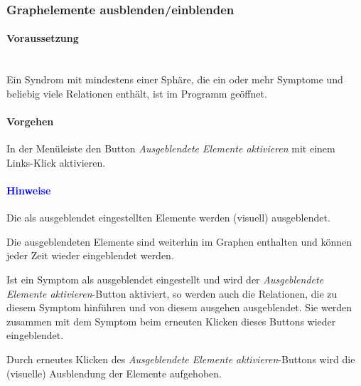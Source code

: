 \documentclass[enabledeprecatedfontcommands,fontsize=11pt,paper=a4,twoside]{scrartcl}
\newcounter{one}
\newcounter{two}[one]
\newcommand*{\hint}{\paragraph{\textcolor{blue}{Hinweise}}}
\newcommand*{\condition}{\paragraph{Voraussetzung}$\;$ \vspace{0.2cm}\\}
\newcommand*{\action}{\paragraph{Vorgehen}}
\let\tempone\itemize
\let\temptwo\enditemize
\renewenvironment{itemize}{\tempone\addtolength{\itemsep}{-10.0pt}}{\temptwo}
\let\origenumerate\enumerate
\let\origendenumerate\endenumerate
\renewenvironment{enumerate}{\origenumerate \addtolength{\itemsep}{-10.0pt}}{\origendenumerate}
\begin{document}
\subsubsection{Graphelemente ausblenden/einblenden}
		\condition 	
		Ein Syndrom mit mindestens einer Sphäre, die ein oder mehr Symptome und beliebig viele Relationen enthält, ist im Programm geöffnet.
		\action
			\begin{enumerate}
				\item In der Menüleiste den Button \textit{Ausgeblendete Elemente aktivieren} mit einem Links-Klick aktivieren.
			\end{enumerate}
		\hint
		\begin{itemize}
				\item Die als ausgeblendet eingestellten Elemente werden (visuell) ausgeblendet. 
				\item Die ausgeblendeten Elemente sind weiterhin im Graphen enthalten und können jeder Zeit wieder eingeblendet werden. 
				\item Ist ein Symptom als ausgeblendet eingestellt und wird der \textit{Ausgeblendete Elemente aktivieren}-Button aktiviert, so werden auch die Relationen, die zu diesem Symptom hinführen und von diesem ausgehen ausgeblendet. Sie werden zusammen mit dem Symptom beim erneuten Klicken dieses Buttons wieder eingeblendet.
				\item Durch erneutes Klicken des \textit{Ausgeblendete Elemente aktivieren}-Buttons wird die (visuelle) Ausblendung der Elemente aufgehoben. \\
		\end{itemize}
		
\end{document}
